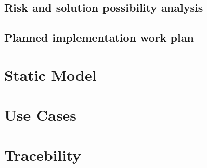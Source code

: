 \documentclass[11pt,a4paper]{article}
\begin{document}
\subsection{Risk and solution possibility analysis}



\subsection{Planned implementation work plan}



\section{Static Model}



\section{Use Cases}

\section{Tracebility}



\end{document}
